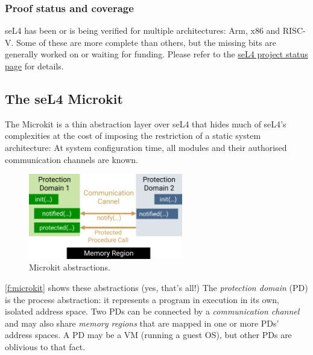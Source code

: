 \documentclass[english,a4paper,12pt]{report}
\newcommand{\SSect}[1]{\subsection{#1}}
\newcommand{\SSSect}[1]{\subsubsection*{#1}}
\newcommand{\SSect}[1]{\section{#1}}
\newcommand{\SSSect}[1]{\subsection*{#1}}
\begin{document}
  \SSSect{Proof status and coverage}

  seL4 has been or is being verified for multiple architectures: Arm,
  x86 and RISC-V. Some of these are more complete than others, but the
  missing bits are generally worked on or waiting for funding. Please
  refer to the
  \href{https://docs.sel4.systems/projects/sel4/status.html}{seL4
    project status page} for details.

  \SSect{The seL4 Microkit}\label{s:microkit}

  The Microkit is a thin abstraction layer over seL4 that hides much
  of seL4's complexities at the cost of imposing the restriction of a
  static system architecture: At system configuration time, all
  modules and their authorised communication channels are known.

  \begin{figure}[b]
    \centering
    \includegraphics[width=0.6\textwidth]{microkit}
    \caption{Microkit abstractions.}
    \label{f:microkit}
  \end{figure}

  \autoref{f:microkit} shows these abstractions (yes, that's all!) The
  \emph{protection domain} (PD) is the process abstraction: it
  represents a program in execution in its own, isolated address
  space. Two PDs can be connected by a \emph{communication channel}
  and may also share \emph{memory regions} that are mapped in one or
  more PDs' address spaces. A PD may be a VM (running a guest OS), but
  other PDs are oblivious to that fact.
\end{document}
